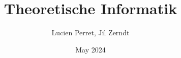 \documentclass[a4paper, fontsize = 8pt, landscape]{scrartcl}
\title{Theoretische Informatik}
\author{Lucien Perret, Jil Zerndt}
\date{May 2024}
\begin{document}
\begin{multicols*}{3}
    \thispagestyle{TitlePageStyle}
		\maketitle

    
    \raggedcolumns
    
    \raggedcolumns
    
    \raggedcolumns
    
    \raggedcolumns
    \columnbreak
    
    \raggedcolumns
    
    \raggedcolumns
    
    \raggedcolumns
    
    \raggedcolumns
    
    \raggedcolumns
    
    \raggedcolumns

\end{multicols*}
\end{document}
